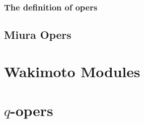             \subsubsection{The definition of opers}
                \begin{definition}[Opers] \label{def: opers}
                    
                \end{definition}
        
        \subsection{Miura Opers}
    
    \section{Wakimoto Modules}
    
    \section{\texorpdfstring{$q$}{}-opers}